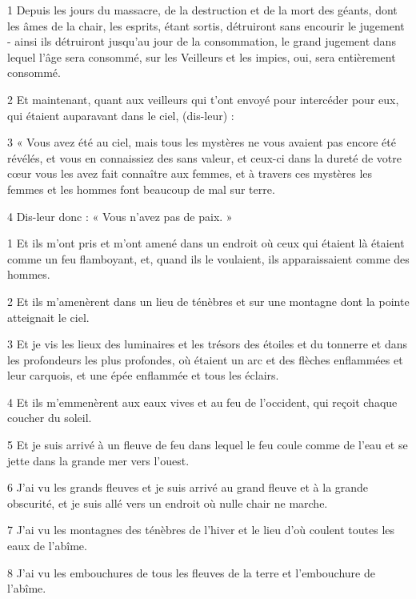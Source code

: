 
\par 1 Depuis les jours du massacre, de la destruction et de la mort des géants, dont les âmes de la chair, les esprits, étant sortis, détruiront sans encourir le jugement - ainsi ils détruiront jusqu'au jour de la consommation, le grand jugement dans lequel l'âge sera consommé, sur les Veilleurs et les impies, oui, sera entièrement consommé.
\par 2 Et maintenant, quant aux veilleurs qui t'ont envoyé pour intercéder pour eux, qui étaient auparavant dans le ciel, (dis-leur) :
\par 3 « Vous avez été au ciel, mais tous les mystères ne vous avaient pas encore été révélés, et vous en connaissiez des sans valeur, et ceux-ci dans la dureté de votre cœur vous les avez fait connaître aux femmes, et à travers ces mystères les femmes et les hommes font beaucoup de mal sur terre.
\par 4 Dis-leur donc : « Vous n'avez pas de paix. »


\par 1 Et ils m'ont pris et m'ont amené dans un endroit où ceux qui étaient là étaient comme un feu flamboyant, et, quand ils le voulaient, ils apparaissaient comme des hommes.
\par 2 Et ils m'amenèrent dans un lieu de ténèbres et sur une montagne dont la pointe atteignait le ciel.
\par 3 Et je vis les lieux des luminaires et les trésors des étoiles et du tonnerre et dans les profondeurs les plus profondes, où étaient un arc et des flèches enflammées et leur carquois, et une épée enflammée et tous les éclairs.
\par 4 Et ils m'emmenèrent aux eaux vives et au feu de l'occident, qui reçoit chaque coucher du soleil.
\par 5 Et je suis arrivé à un fleuve de feu dans lequel le feu coule comme de l'eau et se jette dans la grande mer vers l'ouest.
\par 6 J'ai vu les grands fleuves et je suis arrivé au grand fleuve et à la grande obscurité, et je suis allé vers un endroit où nulle chair ne marche.
\par 7 J'ai vu les montagnes des ténèbres de l'hiver et le lieu d'où coulent toutes les eaux de l'abîme.
\par 8 J'ai vu les embouchures de tous les fleuves de la terre et l'embouchure de l'abîme.

